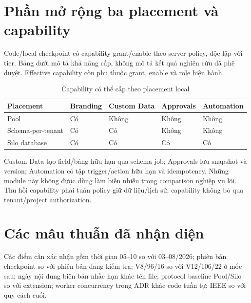 \section{Phần mở rộng ba placement và capability}
Code\slash local checkpoint có capability grant\slash enable theo server policy, độc lập với tier. Bảng dưới mô tả khả năng cấp, không mô tả kết quả nghiên cứu đã phê duyệt. Effective capability còn phụ thuộc grant, enable và role hiện hành.
\begin{table}[htbp]
\centering\caption{Capability có thể cấp theo placement local}\label{tab:capabilities}
\begin{tabularx}{\textwidth}{XP{.15\textwidth}P{.15\textwidth}P{.15\textwidth}P{.15\textwidth}}
\toprule Placement & Branding & Custom Data & Approvals & Automation \\
\midrule
Pool & Có & Không & Không & Không \\
Schema-per-tenant & Có & Có & Không & Không \\
Silo database & Có & Có & Có & Có \\
\bottomrule\end{tabularx}
\end{table}
Custom Data tạo field\slash bảng hữu hạn qua schema job; Approvals lưu snapshot và version; Automation có tập trigger\slash action hữu hạn và idempotency. Những module này không được dùng làm biến nhiễu trong comparison nghiệp vụ lõi. Thu hồi capability phải tuân policy giữ dữ liệu\slash lịch sử; capability không bỏ qua tenant\slash project authorization.

\section{Các mâu thuẫn đã nhận diện}
Các điểm cần xác nhận gồm thời gian 05--10 so với 03--08\slash 2026; phiên bản checkpoint so với phiên bản đang kiểm tra; V8\slash 96\slash 16 so với V12\slash 106\slash 22 ở mốc sau; ngày nội dung biên bản nhắc hạn khác tên file; protocol baseline Pool\slash Silo so với extension; worker concurrency trong ADR khác code tuần tự; IEEE so với quy cách cuối.

